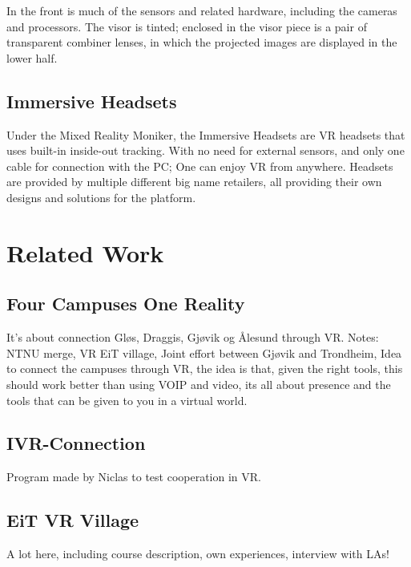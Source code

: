     In the front is much of the sensors and related hardware, including the cameras and processors. The visor is tinted; enclosed in the visor piece is a pair of transparent combiner lenses, in which the projected images are displayed in the lower half. %

    \subsection{Immersive Headsets}
    Under the Mixed Reality Moniker, the Immersive Headsets are VR headsets that uses built-in inside-out tracking. With no need for external sensors, and only one cable for connection with the PC; One can enjoy VR from anywhere. 
    Headsets are provided by multiple different big name retailers, all providing their own designs and solutions for the platform.

\section{Related Work}
    \subsection{Four Campuses One Reality}
    It's about connection Gløs, Draggis, Gjøvik og Ålesund through VR.
    Notes: NTNU merge, VR EiT village, Joint effort between Gjøvik and Trondheim, Idea to connect the campuses through VR, the idea is that, given the right tools, this should work better than using VOIP and video, its all about presence and the tools that can be given to you in a virtual world.

    \subsection{IVR-Connection}
    Program made by Niclas to test cooperation in VR.
    
    \subsection{EiT VR Village}
    A lot here, including course description, own experiences, interview with LAs!
